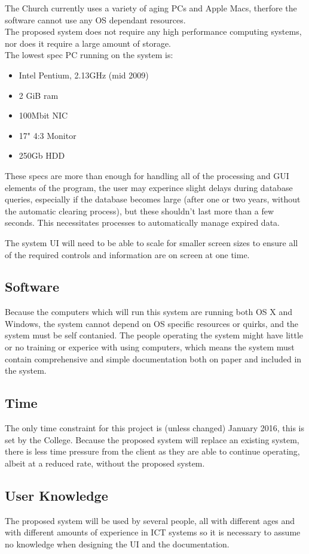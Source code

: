 	The Church currently uses a variety of aging PCs and Apple Macs, therfore the software cannot use any OS dependant resources.
	\\The proposed system does not require any high performance computing systems, nor does it require a large amount of storage.
	\\The lowest spec PC running on the system is:
	\begin{itemize}
		\item Intel Pentium, 2.13GHz (mid 2009)
		\item 2 GiB ram
		\item 100Mbit NIC
		\item 17" 4:3 Monitor
		\item 250Gb HDD
	\end{itemize}
	These specs are more than enough for handling all of the processing and GUI elements of the program, the user may experince slight delays during database queries, especially if the database becomes large (after one or two years, without the automatic clearing process), but these shouldn't last more than a few seconds. This necessitates processes to automatically manage expired data.


	The system UI will need to be able to scale for smaller screen sizes to ensure all of the required controls and information are on screen at one time.


\subsection{Software}
	Because the computers which will run this system are running both OS X and Windows, the system cannot depend on OS specific resources or quirks, and the system must be self contanied. The people operating the system might have little or no training or experice with using computers, which means the system must contain comprehensive and simple documentation both on paper and included in the system.

\subsection{Time}
	The only time constraint for this project is (unless changed) January 2016, this is set by the College. Because the proposed system will replace an existing system, there is less time pressure from the client as they are able to continue operating, albeit at a reduced rate, without the proposed system.

\subsection{User Knowledge}
	The proposed system will be used by several people, all with different ages and with different amounts of experience in ICT systems so it is necessary to assume no knowledge when designing the UI and the documentation.

